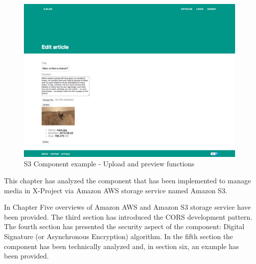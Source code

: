 \paragraph{}


\begin {figure}[h]
\graphicspath{{images/chapter_s3/}}
\includegraphics[width=\textwidth]{s3_example}
\caption{S3 Component example - Upload and preview functions}
\end {figure}

This chapter has analyzed the component that has been implemented to manage media in X-Project via Amazon AWS storage service named Amazon S3.

In Chapter Five overviews of Amazon AWS and Amazon S3 storage service have been provided. The third section has introduced the CORS development pattern. The fourth section has presented the security aspect of the component: Digital Signature (or Asynchronous Encryption) algorithm. In the fifth section the component has been technically analyzed and, in section six, an example has been provided.